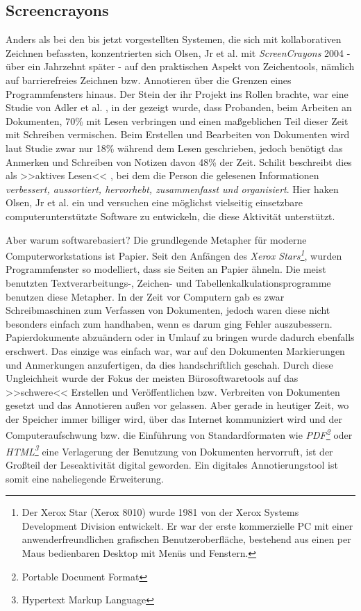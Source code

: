 \subsection{Screencrayons}
Anders als bei den bis jetzt vorgestellten Systemen, die sich mit kollaborativen Zeichnen befassten, konzentrierten sich Olsen, Jr et al. mit \emph{ScreenCrayons} 2004 - über ein Jahrzehnt später - auf den praktischen Aspekt von Zeichentools, nämlich auf barrierefreies Zeichnen bzw. Annotieren über die Grenzen eines Programmfensters hinaus.
Der Stein der ihr Projekt ins Rollen brachte, war eine Studie von Adler et al. \citep{Adler:1998}, in der gezeigt wurde, dass Probanden, beim Arbeiten an Dokumenten, 70\% mit Lesen verbringen und einen maßgeblichen Teil dieser Zeit mit Schreiben vermischen. Beim Erstellen und Bearbeiten von Dokumenten wird laut Studie zwar nur 18\% während dem Lesen geschrieben, jedoch benötigt das Anmerken und Schreiben von Notizen davon 48\% der Zeit. Schilit beschreibt dies als >>aktives Lesen<< \citep{Schilit:1998}, bei dem die Person die gelesenen Informationen \emph{verbessert, aussortiert, hervorhebt, zusammenfasst und organisiert}. Hier haken Olsen, Jr et al. \citep{Olsen:2004} ein und versuchen eine möglichst vielseitig einsetzbare computerunterstützte Software zu entwickeln, die diese Aktivität unterstützt.

\medskip Aber warum softwarebasiert? Die grundlegende Metapher für moderne Computerworkstations ist Papier. Seit den Anfängen des \emph{Xerox Stars\footnote{Der Xerox Star (Xerox 8010) wurde 1981 von der Xerox Systems Development Division entwickelt. Er war der erste kommerzielle PC mit einer anwenderfreundlichen grafischen Benutzeroberfläche, bestehend aus einen per Maus bedienbaren Desktop mit Menüs und Fenstern.}}, wurden Programmfenster so modelliert, dass sie Seiten an Papier ähneln. Die meist benutzten Textverarbeitungs-, Zeichen- und Tabellenkalkulationsprogramme benutzen diese Metapher. 
In der Zeit vor Computern gab es zwar Schreibmaschinen zum Verfassen von Dokumenten, jedoch waren diese nicht besonders einfach zum handhaben, wenn es darum ging Fehler auszubessern. Papierdokumente abzuändern oder in Umlauf zu bringen wurde dadurch ebenfalls erschwert. Das einzige was einfach war, war auf den Dokumenten Markierungen und Anmerkungen anzufertigen, da dies handschriftlich geschah.
Durch diese Ungleichheit wurde der Fokus der meisten Bürosoftwaretools auf das >>schwere<< Erstellen und Veröffentlichen bzw. Verbreiten von Dokumenten gesetzt und das Annotieren außen vor gelassen. Aber gerade in heutiger Zeit, wo der Speicher immer billiger wird, über das Internet kommuniziert wird und der Computeraufschwung bzw. die Einführung von Standardformaten wie \emph{PDF\footnote{Portable Document Format}} oder \emph{HTML\footnote{Hypertext Markup Language}} eine Verlagerung der Benutzung von Dokumenten hervorruft, ist der Großteil der Leseaktivität digital geworden. Ein digitales Annotierungstool ist somit eine naheliegende Erweiterung.

